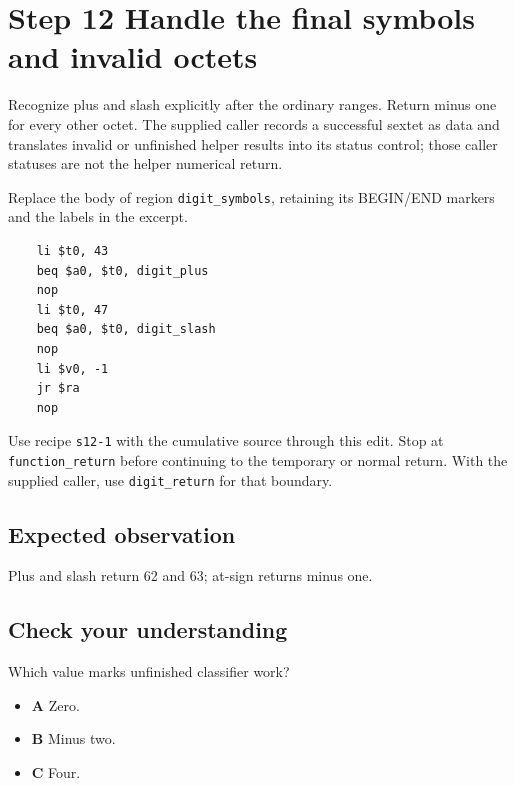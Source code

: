\section{Step 12 Handle the final symbols and invalid octets}\label{base64-s12}

Recognize plus and slash explicitly after the ordinary ranges. Return minus one for every other octet. The supplied caller records a successful sextet as data and translates invalid or unfinished helper results into its status control; those caller statuses are not the helper numerical return.

Replace the body of region \texttt{digit\_symbols}, retaining its BEGIN/END markers and the labels in the excerpt.

\begin{verbatim}
    li $t0, 43
    beq $a0, $t0, digit_plus
    nop
    li $t0, 47
    beq $a0, $t0, digit_slash
    nop
    li $v0, -1
    jr $ra
    nop
\end{verbatim}

Use recipe \texttt{s12-1} with the cumulative source through this edit. Stop at \texttt{function\_return} before continuing to the temporary or normal return. With the supplied caller, use \texttt{digit\_return} for that boundary.

\subsection{Expected observation}
Plus and slash return 62 and 63; at-sign returns minus one.

\subsection{Check your understanding}
Which value marks unfinished classifier work?

\begin{itemize}
\item \textbf{A} Zero.
\item \textbf{B} Minus two.
\item \textbf{C} Four.
\end{itemize}
